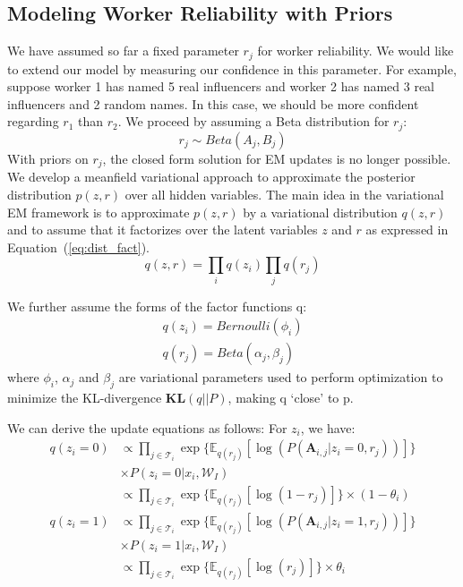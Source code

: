 \subsection{Modeling Worker Reliability with Priors}
We have assumed so far a fixed parameter $r_j$ for worker reliability. 
We would like to extend our model by measuring our confidence in this parameter.
For example, suppose worker 1 has named 5 real influencers and worker 2 has named 
3 real influencers and 2 random names. In this case, we should be more confident
regarding $r_1$ than $r_2$. We proceed by assuming a Beta distribution for $r_j$:
\begin{equation}
		r_j \sim Beta(A_j,B_j)
		\label{eq:rj_dist}
\end{equation}
With priors on $r_j$, the closed form solution  for EM updates is no longer possible.
We develop a meanfield variational approach to approximate the posterior distribution 
$p(z,r)$ over all hidden variables. 
The main idea in the variational EM framework \cite{bayes2008variational} is to approximate $p(z,r)$ 
by a variational distribution $q(z,r)$ and to assume that it factorizes over
the latent variables $z$ and $r$ as expressed in Equation~(\ref{eq:dist_fact}).
\begin{equation}
	q(z,r)=\prod_{i} q(z_i) \prod_j q(r_j)
	\label{eq:dist_fact}
\end{equation}

We further assume the forms of the factor functions q:
\begin{align}
	q(z_i)=Bernoulli(\phi_i) \\
	q(r_j)=Beta(\alpha_j,\beta_j)
\end{align}
where $\phi_i$, $\alpha_j$ and $\beta_j$ are variational parameters
used to perform optimization to minimize the KL-divergence $\mathbf{KL}(q||P)$, 
making q ‘close’ to p.

We can derive the update equations as follows:
For $z_i$, we have:
\begin{align}
    q(z_i=0)    &\propto \prod_{j \in \mathcal{T}_{i}} \exp{\{\mathbb{E}_{q(r_j)}[\log (P(\mathbf{A}_{i,j}|z_i=0,r_j))]\}}				\nonumber \\ &\times P(z_i=0|x_i, \mathcal{W}_I)  \nonumber \\
                &\propto \prod_{j \in \mathcal{T}_{i}} \exp{\{\mathbb{E}_{q(r_j)}[\log (1-r_j)]\}}\times (1-\theta_i) \nonumber \\
    q(z_i=1)    &\propto \prod_{j \in \mathcal{T}_{i}} \exp{\{\mathbb{E}_{q(r_j)}[\log (P(\mathbf{A}_{i,j}|z_i=1,r_j))]\}}\nonumber \\ &\times P(z_i=1|x_i, \mathcal{W}_I)   \nonumber \\
                &\propto \prod_{j \in \mathcal{T}_{i}} \exp{\{\mathbb{E}_{q(r_j)}[\log (r_j)]\}}\times \theta_i 
\label{eq:q_two_poss}                
\end{align}

